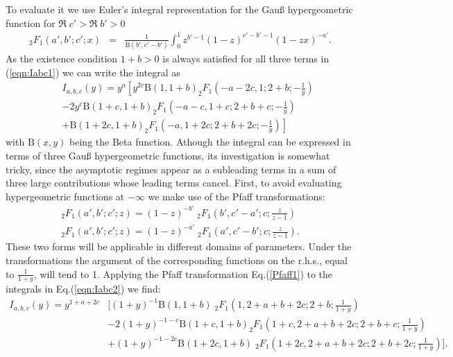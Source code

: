 To evaluate it we use Euler's integral representation for the Gau{\ss} hypergeometric function for $\Re \; c' > \Re \; b' > 0$
\begin{eqnarray}
_{2}F_{1}(a',b';c';x) &=& \frac{1}{\mathrm{B}(b',c'-b')}    \int_{0}^{1} z^{b'-1} (1-z)^{c'-b'-1} (1-zx)^{-a'} \label{IntegralRep}. 
\end{eqnarray}
As the existence condition $1+b>0$ is always satisfied for all three terms in (\ref{eqn:Iabc1}) we can write the integral as
\begin{eqnarray}
&& I_{a,b,c}(y) = \label{eqn:Iabc2}  y^a  \left[  y^{2c} \mathrm{B}(1,1+b) _2F_1 \left(-a-2c,1;2+b; -\frac{1}{y} \right) \right.  \\
&& -2 y^{c} \mathrm{B}(1+c, 1+b) _2F_1 \left(-a-c,1+c;2+b+c; -\frac{1}{y} \right) \nonumber \\ 
&& \left. + \mathrm{B}(1+2c , 1+b) _2F_1 \left(-a,1+2c;2+b+2c; -\frac{1}{y} \right) \right]  \nonumber 
\end{eqnarray}
with $\mathrm{B}(x,y)$ being the Beta function. 
Athough the integral can be expressed in terms of three Gau{\ss} hypergeometric functions,
its investigation is somewhat tricky, since the asymptotic regimes appear as a subleading terms 
in a sum of three large contributions whose leading terms cancel. First, to avoid evaluating hypergeometric functions at $-\infty$ 
we make use of the Pfaff transformations:
\begin{align}
_2F_1(a',b';c';z) = (1-z)^{-b'} \; _2F_1 \left( b',c'-a';c;\frac{z}{z-1} \right) \label{Pfaff1} \\
_2F_1(a',b';c';z) = (1-z)^{-a'} \; _2F_1 \left( a',c'-b';c;\frac{z}{z-1} \right). \label{Pfaff2}
\end{align}
These two forms will be applicable in different domains of parameters. Under the transformations the argument of the corresponding functions on the r.h.s., equal to $\frac{1}{1+y}$, will tend to 1. Applying the Pfaff transformation Eq.(\ref{Pfaff1}) to the integrals in Eq.(\ref{eqn:Iabc2}) we find:
%
\begin{align*}
 I_{a,b,c}(y) = y^{1+a+2c} & \bigg[  (1+y)^{-1} \mathrm{B}(1,1+b)  \;  _2F_1 \left(1,2+a+b+2c;2+b; \frac{1}{1+y} \right)  \\ 
&  -2 (1+y)^{-1-c} \mathrm{B}(1+c, 1+b)   _2F_1 \left(1+c,2+a+b+2c;2+b+c; \frac{1}{1+y} \right) \\ 
&  + (1+y)^{-1-2c} \mathrm{B}(1+2c , 1+b)  \;  _2F_1 \left(1+2c,2+a+b+2c;2+b+2c;\frac{1}{1+y} \right) \bigg].
\end{align*} 
